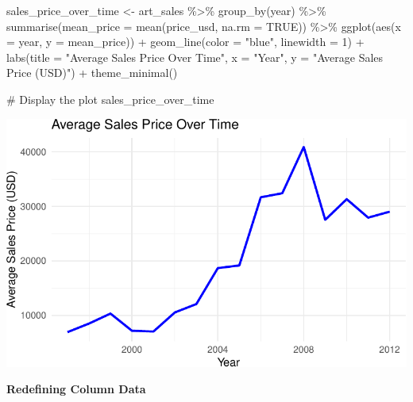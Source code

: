 \documentclass[
  12pt,
]{article}
\newenvironment{Shaded}{\begin{snugshade}}{\end{snugshade}}
\newcommand{\AttributeTok}[1]{\textcolor[rgb]{0.40,0.45,0.13}{#1}}
\newcommand{\CommentTok}[1]{\textcolor[rgb]{0.37,0.37,0.37}{#1}}
\newcommand{\ConstantTok}[1]{\textcolor[rgb]{0.56,0.35,0.01}{#1}}
\newcommand{\DecValTok}[1]{\textcolor[rgb]{0.68,0.00,0.00}{#1}}
\newcommand{\FunctionTok}[1]{\textcolor[rgb]{0.28,0.35,0.67}{#1}}
\newcommand{\NormalTok}[1]{\textcolor[rgb]{0.00,0.23,0.31}{#1}}
\newcommand{\OtherTok}[1]{\textcolor[rgb]{0.00,0.23,0.31}{#1}}
\newcommand{\SpecialCharTok}[1]{\textcolor[rgb]{0.37,0.37,0.37}{#1}}
\newcommand{\StringTok}[1]{\textcolor[rgb]{0.13,0.47,0.30}{#1}}
\begin{document}
\begin{Shaded}
\begin{Highlighting}[]
\NormalTok{sales\_price\_over\_time }\OtherTok{\textless{}{-}}\NormalTok{ art\_sales }\SpecialCharTok{\%\textgreater{}\%}
  \FunctionTok{group\_by}\NormalTok{(year) }\SpecialCharTok{\%\textgreater{}\%}
  \FunctionTok{summarise}\NormalTok{(}\AttributeTok{mean\_price =} \FunctionTok{mean}\NormalTok{(price\_usd, }\AttributeTok{na.rm =} \ConstantTok{TRUE}\NormalTok{)) }\SpecialCharTok{\%\textgreater{}\%}
  \FunctionTok{ggplot}\NormalTok{(}\FunctionTok{aes}\NormalTok{(}\AttributeTok{x =}\NormalTok{ year, }\AttributeTok{y =}\NormalTok{ mean\_price)) }\SpecialCharTok{+}
  \FunctionTok{geom\_line}\NormalTok{(}\AttributeTok{color =} \StringTok{"blue"}\NormalTok{, }\AttributeTok{linewidth =} \DecValTok{1}\NormalTok{) }\SpecialCharTok{+}
  \FunctionTok{labs}\NormalTok{(}\AttributeTok{title =} \StringTok{"Average Sales Price Over Time"}\NormalTok{, }\AttributeTok{x =} \StringTok{"Year"}\NormalTok{, }
       \AttributeTok{y =} \StringTok{"Average Sales Price (USD)"}\NormalTok{) }\SpecialCharTok{+}
  \FunctionTok{theme\_minimal}\NormalTok{()}

\CommentTok{\# Display the plot}
\NormalTok{sales\_price\_over\_time}
\end{Highlighting}
\end{Shaded}

\includegraphics{506-HW-5_files/figure-pdf/unnamed-chunk-7-1.pdf}

\textbf{Redefining Column Data}
\end{document}
